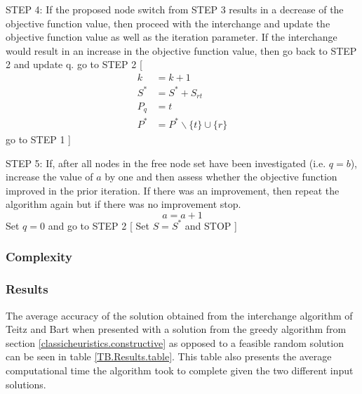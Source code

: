 \documentclass[11pt]{article}
\begin{document}
	\begin{algorithm}
		\begin{algorithmic}[0]
			
			\Statex 
			\Statex STEP 4: If the proposed node switch from STEP 3 results in a decrease of the objective function value, then proceed with the interchange and update the objective function value as well as the  iteration parameter.  If the interchange would result in an increase in the objective function value, then go back to STEP 2 and update q.
			\Statex go to STEP 2
			[
			\begin{align*}
			k &= k+1\\
			S^* &= S^* + S_{rt}\\
			P_q &= t\\
			P^* & = P^*\backslash \{t\} \cup \{r\}		
			\end{align*}
			\Statex go to STEP 1				
			]
			\EndIf
			
			\Statex	
			
			\Statex 
			\Statex STEP 5: If, after all nodes in the free node set have been investigated (i.e. $q=b$), increase the value of $a$ by one and then assess whether the objective function improved in the prior iteration.  If there was an improvement, then repeat the algorithm again but if there was no improvement stop.
			\begin{equation*}
			a = a+1
			\end{equation*}
			\Statex Set $q=0$ and go to STEP 2
			[
			\Statex Set $S=S^*$ and STOP
			]
			\EndIf
			
			
		\end{algorithmic}
	\end{algorithm}
	
	\subsubsection{Complexity}


	\subsubsection{Results}
	The average accuracy of the solution obtained from the interchange algorithm of Teitz and Bart when presented with a solution from the greedy algorithm from section \ref{classicheuristics.constructive} as opposed to a feasible random solution can be seen in table \ref{TB.Results.table}.  This table also presents the average computational time the algorithm took to complete given the two different input solutions.
	
\end{document}
